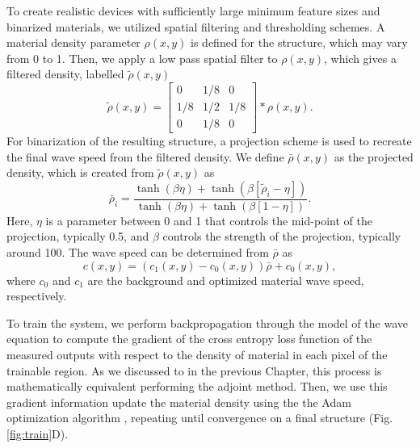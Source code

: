 To create realistic devices with sufficiently large minimum feature sizes and binarized materials, we utilized spatial filtering and thresholding schemes.  A material density parameter $\rho(x,y)$ is defined for the structure, which may vary from 0 to 1.  Then, we apply a low pass spatial filter to $\rho(x,y)$, which gives a filtered density, labelled $\tilde{\rho}(x,y)$
%
\begin{equation}
\tilde{\rho}(x,y) = 
\begin{bmatrix}
0 & 1/8 & 0 \\
1/8 & 1/2 & 1/8 \\
0 & 1/8 & 0
\end{bmatrix}
*
\rho(x,y).
\end{equation}
For binarization of the resulting structure, a projection scheme is used to recreate the final wave speed from the filtered density.  We define $\bar{\rho}(x,y)$ as the projected density, which is created from $\tilde{\rho}(x,y)$ as
\begin{equation}
\bar{\rho}_i = \frac{\tanh{\left( \beta \eta \right)} + \tanh{\left( \beta \left[ \tilde{\rho}_i - \eta \right] \right)}}{\tanh{\left( \beta \eta  \right)} + \tanh{\left( \beta \left[ 1 - \eta \right] \right)}}.
\end{equation}
Here, $\eta$ is a parameter between 0 and 1 that controls the mid-point of the projection, typically 0.5, and $\beta$ controls the strength of the projection, typically around 100.  The wave speed can be determined from $\bar{\rho}$ as
\begin{equation}
c(x,y) = (c_1(x,y) - c_0(x,y))\bar{\rho} + c_0(x,y),
\end{equation}
where $c_0$ and $c_1$ are the background and optimized material wave speed, respectively.

%

To train the system, we perform backpropagation through the model of the wave equation to compute the gradient of the cross entropy loss function of the measured outputs with respect to the density of material in each pixel of the trainable region.
As we discussed to in the previous Chapter, this process is mathematically equivalent performing the adjoint method.
Then, we use this gradient information update the material density using the the Adam optimization algorithm \cite{kingma2014adam}, repeating until convergence on a final structure (Fig. \ref{fig:train}D).

